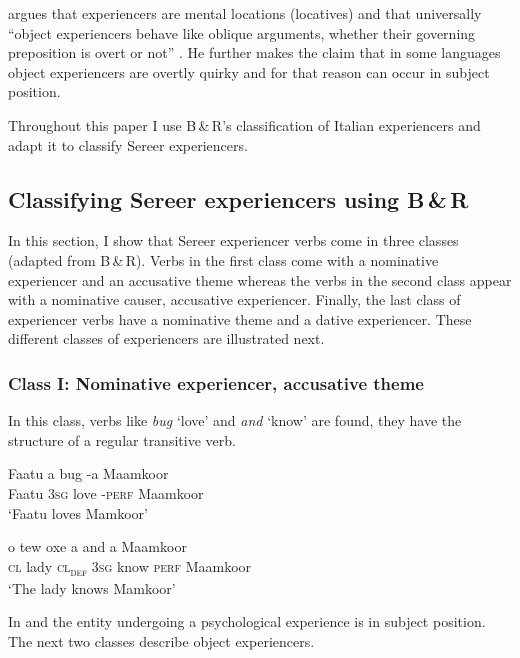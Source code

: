 \documentclass[output=paper]{langscibook}
\begin{document}
\citeauthor{Landau2010} argues that experiencers are mental locations (locatives) and that universally “object experiencers behave like oblique arguments, whether their governing preposition is overt or not” \citet[127]{Landau2010}. He further makes the claim that in some languages object experiencers are overtly quirky and for that reason can occur in subject position.


Throughout this paper I use B\,\&\,R's classification of Italian experiencers and adapt it to classify Sereer experiencers.

\subsection{Classifying Sereer experiencers using B\,\&\,R}

In this section, I show that Sereer experiencer verbs come in three classes (adap\-ted from B\,\&\,R). Verbs in the first class come with a nominative experiencer and an accusative theme whereas the verbs in the second class appear with a nominative causer, accusative experiencer. Finally, the last class of experiencer verbs have a nominative theme and a dative experiencer. These different classes of experiencers are illustrated next. 



\subsubsection{Class I: Nominative experiencer, accusative theme}

In this class, verbs like \textit{bug} ‘love’ and  \textit{and} ‘know’ are found, they have the structure of a regular transitive verb.

\ea \label{ex:tamba:4}
\ea \label{ex:tamba:4a}
\gll Faatu  a      bug    {}-a         Maamkoor\\      
Faatu    \textsc{3sg}  love    {}-\textsc{perf}   Maamkoor\\
\glt `Faatu loves Mamkoor'

\ex \label{ex:tamba:4b}
\gll o  tew  oxe    a     and      a      Maamkoor \\
\textsc{cl}  lady  \textsc{cl\textsubscript{def}}   \textsc{3sg}  know  \textsc{perf}   Maamkoor\\
\glt `The lady knows Mamkoor'
\z
\z
    

In  and  the entity undergoing a psychological experience is in subject position. The next two classes describe object experiencers.
\end{document}
